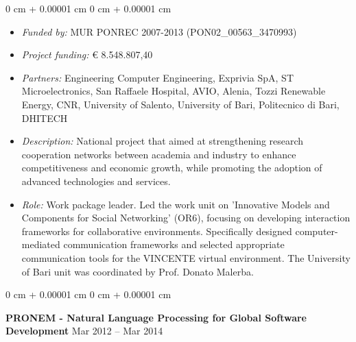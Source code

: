 \documentclass[10pt, a4paper]{article}
\newenvironment{highlights}{
    \begin{itemize}[
        topsep=0.10 cm,
        parsep=0.10 cm,
        partopsep=0pt,
        itemsep=0pt,
        leftmargin=0 cm + 10pt
    ]
}{
    \end{itemize}
} %
\newenvironment{onecolentry}{
    \begin{adjustwidth}{
        0 cm + 0.00001 cm
    }{
        0 cm + 0.00001 cm
    }
}{
    \end{adjustwidth}
} %
\newenvironment{twocolentry}[2][]{
    \onecolentry
    \def\secondColumn{#2}
    \setcolumnwidth{\fill, 4.5 cm}
    \begin{paracol}{2}
}{
    \switchcolumn \raggedleft \secondColumn
    \end{paracol}
    \endonecolentry
} %
\begin{document}
        \vspace{0.10 cm}
        \begin{onecolentry}
            \begin{highlights}
                \item \textit{Funded by:} MUR PONREC 2007-2013 (PON02\_00563\_3470993)
                \item \textit{Project funding:} € 8.548.807,40
                \item \textit{Partners:} Engineering Computer Engineering, Exprivia SpA, ST Microelectronics, San Raffaele Hospital,  AVIO, Alenia, Tozzi Renewable Energy, CNR, University of Salento, University of Bari, Politecnico di Bari, DHITECH
                \item \textit{Description:} National project that aimed at strengthening research cooperation networks between academia and industry to enhance competitiveness and economic growth, while promoting the adoption of advanced technologies and services.
                \item \textit{Role:} Work package leader. Led the work unit on 'Innovative Models and Components for Social Networking' (OR6), focusing on developing interaction frameworks for collaborative environments. Specifically designed computer-mediated communication frameworks and selected appropriate communication tools for the VINCENTE virtual environment. The University of Bari unit was coordinated by Prof. Donato Malerba.
            \end{highlights}
        \end{onecolentry}


        \vspace{0.2 cm}

        \begin{twocolentry}{
            Mar 2012 – Mar 2014
        }
            \textbf{PRONEM - Natural Language Processing for Global Software Development}\end{twocolentry}
\end{document}
